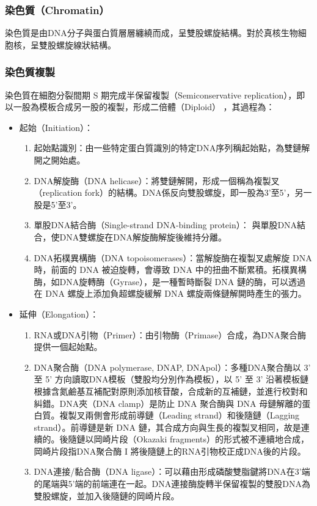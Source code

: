 \documentclass[a4paper,12pt]{report}
\begin{document}
\subsubsection{染色質（Chromatin）}
染色質是由DNA分子與蛋白質層層纏繞而成，呈雙股螺旋結構。對於真核生物細胞核，呈雙股螺旋線狀結構。
\subsubsection{染色質複製}
染色質在細胞分裂間期 S 期完成半保留複製（Semiconservative replication），即以一股為模板合成另一股的複製，形成二倍體（Diploid） ，其過程為：
  \begin{itemize}
    \item 起始（Initiation）：
    \begin{enumerate}[label=\Roman*.]
    \item 起始點識別：由一些特定蛋白質識別的特定DNA序列稱起始點，為雙鏈解開之開始處。
    \item DNA解旋酶（DNA helicase）：將雙鏈解開，形成一個稱為複製叉（replication fork）的結構。DNA係反向雙股螺旋，即一股為3'至5'，另一股是5'至3'。
    \item 單股DNA結合酶（Single-strand DNA-binding protein）： 與單股DNA結合，使DNA雙螺旋在DNA解旋酶解旋後維持分離。
    \item DNA拓樸異構酶（DNA topoisomerases）：當解旋酶在複製叉處解旋 DNA 時，前面的 DNA 被迫旋轉，會導致 DNA 中的扭曲不斷累積。拓樸異構酶，如DNA旋轉酶（Gyrase），是一種暫時斷裂 DNA 鏈的酶，可以透過在 DNA 螺旋上添加負超螺旋緩解 DNA 螺旋兩條鏈解開時產生的張力。
    \end{enumerate}
    \item 延伸（Elongation）：
    \begin{enumerate}[label=\Roman*.]
    \item RNA或DNA引物（Primer）：由引物酶（Primase）合成，為DNA聚合酶提供一個起始點。
    \item DNA聚合酶（DNA polymerase, DNAP, DNApol）：多種DNA聚合酶以 3' 至 5' 方向讀取DNA模板（雙股均分別作為模板），以 5' 至 3' 沿著模板鏈根據含氮鹼基互補配對原則添加核苷酸，合成新的互補鏈，並進行校對和糾錯。DNA夾（DNA clamp）是防止 DNA 聚合酶與 DNA 母鏈解離的蛋白質。複製叉兩側會形成前導鏈（Leading strand）和後隨鏈（Lagging strand）。前導鏈是新 DNA 鏈，其合成方向與生長的複製叉相同，故是連續的。後隨鏈以岡崎片段（Okazaki fragments）的形式被不連續地合成，岡崎片段指DNA聚合酶 I 將後隨鏈上的RNA引物校正成DNA後的片段。
    \item DNA連接/黏合酶（DNA ligase）：可以藉由形成磷酸雙脂鍵將DNA在3'端的尾端與5'端的前端連在一起。DNA連接酶旋轉半保留複製的雙股DNA為雙股螺旋，並加入後隨鏈的岡崎片段。

\end{enumerate}
\end{itemize}
\end{document}
